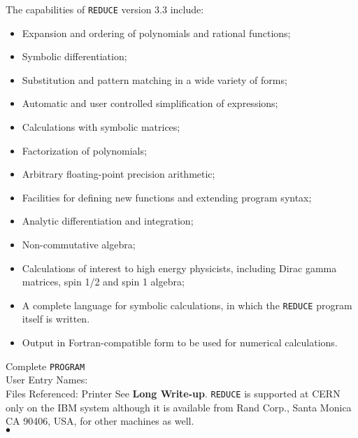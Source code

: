                            
                     
                   
The capabilities of {\tt REDUCE} version 3.3 include:
\begin{itemize}
\item  Expansion and ordering of polynomials and rational functions;
\item  Symbolic differentiation;
\item  Substitution and pattern matching in a wide variety of forms;
\item  Automatic and user controlled simplification of expressions;
\item  Calculations with symbolic matrices;
\item  Factorization of polynomials;
\item  Arbitrary floating-point precision arithmetic;
\item  Facilities for defining new functions and extending program
       syntax;
\item  Analytic differentiation and integration;
\item  Non-commutative algebra;
\item  Calculations of interest to high energy physicists, including
        Dirac gamma matrices, spin 1/2 and spin 1 algebra;
\item  A complete language for symbolic calculations, in which
       the {\tt REDUCE} program itself is written.
\item  Output in Fortran-compatible form to be used for numerical
       calculations.
\end{itemize}
\Structure
Complete {\tt PROGRAM}\\
User Entry Names: \\
Files Referenced: Printer
\Usage
See {\bf Long Write-up}.
\Notes
{\tt REDUCE} is supported at CERN only on the IBM system although
it is available from Rand Corp., Santa Monica CA 90406, USA, for other
machines as well.
\\ $\bullet$
